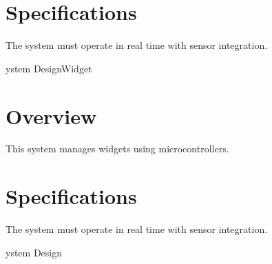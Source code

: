 \documentclass{article}
\begin{document}
\section{Specifications}
The system must operate in real time with sensor integration.

ystem DesignWidget \section{Overview}
This system manages widgets using microcontrollers.

\section{Specifications}
The system must operate in real time with sensor integration.

ystem Design
\end{document}
